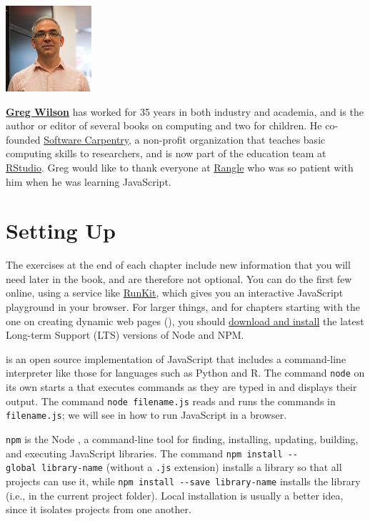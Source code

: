 \begin{center}
  \includegraphics{figures/wilson-greg.png}
\end{center}

\noindent
\textbf{\href{http://third-bit.com/}{Greg Wilson}} has worked for 35 years in both industry and
academia, and is the author or editor of several books on computing and two for
children. He co-founded \href{http://carpentries.org}{Software Carpentry}, a non-profit
organization that teaches basic computing skills to researchers, and is now part
of the education team at \href{http://rstudio.com}{RStudio}. Greg would like to
thank everyone at \href{https://rangle.io/}{Rangle} who was so patient with him when
he was learning JavaScript.

\section{Setting Up}\label{s:intro-setup}

The exercises at the end of each chapter include new information
that you will need later in the book,
and are therefore not optional.
You can do the first few online,
using a service like \href{https://runkit.com/}{RunKit},
which gives you an interactive JavaScript playground in your browser.
For larger things,
and for chapters starting with the one on creating dynamic web pages (),
you should \href{https://nodejs.org/en/download/}{download and install} the latest Long-term Support (LTS) versions of Node and NPM.

 is an open source implementation of JavaScript
that includes a command-line interpreter like those for languages such as Python and R.
The command \texttt{node} on its own starts a 
that executes commands as they are typed in and displays their output.
The command \texttt{node\ filename.js} reads and runs the commands in \texttt{filename.js};
we will see in  how to run JavaScript in a browser.

\texttt{npm}
is the Node ,
a command-line tool for finding, installing, updating, building, and executing JavaScript libraries.
The command \texttt{npm\ install\ -\/-global\ library-name} (without a \texttt{.js} extension)
installs a library  so that all projects can use it,
while \texttt{npm\ install\ -\/-save\ library-name} installs the library 
(i.e., in the current project folder).
Local installation is usually a better idea,
since it isolates projects from one another.

